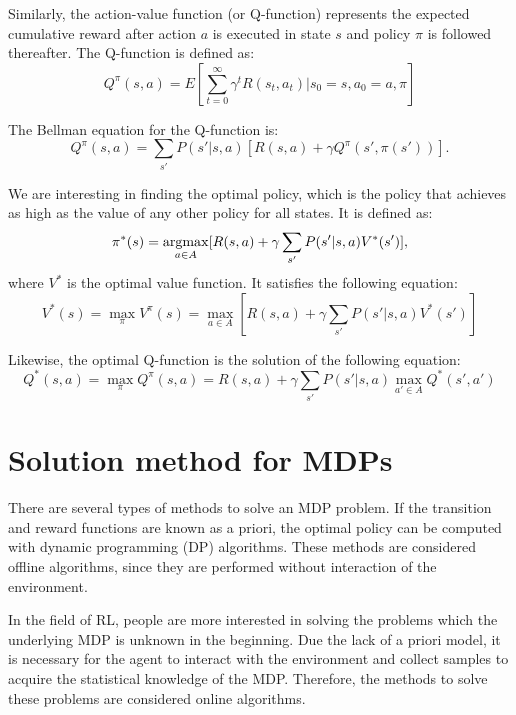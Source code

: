Similarly, the action-value function (or Q-function) represents the expected
cumulative reward after action $a$ is executed in state $s$ and policy $\pi$ is
followed thereafter.
The Q-function is defined as:
\begin{equation}
    Q^{\pi}(s, a) = E[\sum_{t=0}^{\infty}\gamma^t R(s_t, a_t) | s_0=s, a_0 = a, \pi]
\end{equation}

The Bellman equation for the Q-function is:
\begin{equation}
    Q^{\pi}(s, a) = \sum_{s'}P(s'|s, a)[R(s, a) + \gamma Q^{\pi}(s', \pi(s'))].
    \label{eq:Q}
\end{equation}

We are interesting in finding the optimal policy, which is the policy 
that achieves as high as the value of any other policy for all states.
It is defined as:
\begin{equation}
    \pi^*(s) = \argmax_{a \in A} [R(s, a) + \gamma \sum_{s'} P(s'|s, a)V^*(s')],
\end{equation}
where $V^*$ is the optimal value function. It satisfies the following equation:
\begin{equation}
    V^*(s) = \max_{\pi} V^{\pi} (s) = \max_{a \in A} [R(s, a) + \gamma \sum_{s'} P(s'|s, a)V^*(s')]
\end{equation}

Likewise, the optimal Q-function is the solution of the following equation:
\begin{equation}
    Q^*(s, a) = \max_{\pi} Q^{\pi}(s, a) = R(s, a) + \gamma \sum_{s'} P(s'|s, a) \max_{a' \in A} Q^*(s', a')
    \label{eq:optimalQ}
\end{equation}

\section{Solution method for MDPs}

There are several types of methods to solve an MDP problem.
If the transition and reward functions are known as a priori, 
the optimal policy can be computed with dynamic programming (DP) algorithms.
These methods are considered offline algorithms, since they are performed without
interaction of the environment.

In the field of RL, people are more interested in solving the problems which
the underlying MDP is unknown in the beginning. 
Due the lack of a priori model, it is necessary for the agent to interact with
the environment and collect samples to acquire the statistical knowledge of the MDP.
Therefore, the methods to solve these
problems are considered online algorithms.

